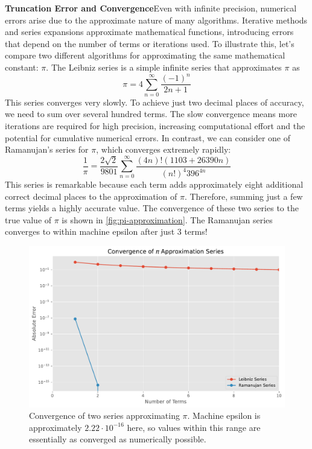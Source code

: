\textbf{Truncation Error and Convergence}\quad Even with infinite precision, numerical errors arise due to the approximate nature of many algorithms. Iterative methods and series expansions approximate mathematical functions, introducing errors that depend on the number of terms or iterations used. To illustrate this, let's compare two different algorithms for approximating the same mathematical constant: \(\pi\). The Leibniz series is a simple infinite series that approximates \(\pi\) as
\begin{equation*}
\pi = 4 \sum_{n=0}^\infty \frac{(-1)^n}{2n+1}
\end{equation*}
This series converges very slowly. To achieve just two decimal places of accuracy, we need to sum over several hundred terms. The slow convergence means more iterations are required for high precision, increasing computational effort and the potential for cumulative numerical errors. In contrast, we can consider one of Ramanujan's series for \(\pi\), which converges extremely rapidly:
\begin{equation*}
    \frac{1}{\pi} = \frac{2\sqrt{2}}{9801} \sum_{n=0}^\infty \frac{(4n)! (1103 + 26390n)}{(n!)^4 396^{4n}}
\end{equation*}
This series is remarkable because each term adds approximately eight additional correct decimal places to the approximation of \(\pi\). Therefore, summing just a few terms yields a highly accurate value. The convergence of these two series to the true value of $\pi$ is shown in \autoref{fig:pi-approximation}. The Ramanujan series converges to within machine epsilon after just 3 terms!

\begin{figure}[!h]
    \centering
    \includegraphics[width=.65\textwidth]{figs/computation/pi-convergence.pdf}
    \caption{Convergence of two series approximating \(\pi\). Machine epsilon is approximately \(2.22 \cdot 10^{-16}\) here, so values within this range are essentially as converged as numerically possible.}
    \label{fig:pi-approximation}
\end{figure}

